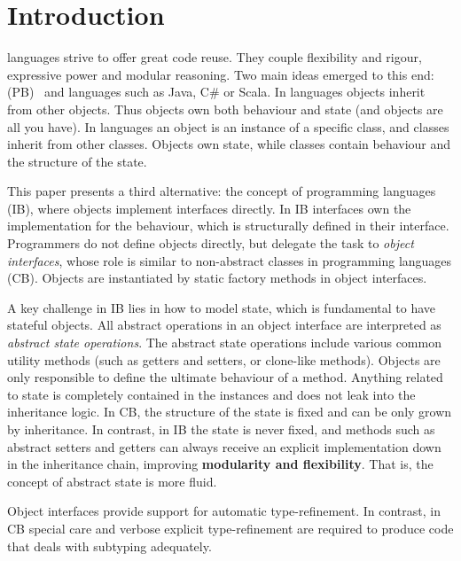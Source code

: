 \section{Introduction}\label{sec:intro}

\Objectoriented languages strive to offer great code reuse.
They couple flexibility and rigour, expressive power and
modular reasoning.  Two main ideas emerged to this end:
\prototypebased (PB)~\cite{Ungar87self} and \classbased languages such as
Java, C\# or Scala.  In \prototypebased
languages objects inherit from other objects. Thus objects own
both behaviour and state (and objects are all you have).
In \classbased languages an object is an instance of a specific class,
and classes inherit from other classes.  Objects own state,
while classes contain behaviour and the structure of the state.

This paper presents a third alternative: the concept of
\emph{\interfacebased} \objectoriented programming languages (IB), where objects
implement interfaces directly. In IB interfaces own the implementation
for the behaviour, which is structurally defined in their
interface. Programmers do not define objects directly, but delegate
the task to \emph{object interfaces}, whose role is similar to non-abstract
classes in \classbased \objectoriented programming languages
(CB). Objects 
are instantiated by static factory methods in object interfaces.

A key challenge in IB lies in how to model state, which is
fundamental to have stateful objects. All abstract operations in an
object interface are interpreted as \emph{abstract state
  operations}. The abstract state operations include various common
utility methods (such as getters and setters, or clone-like
methods). Objects are only responsible to define the ultimate
behaviour of a method. %
Anything related to state is completely contained in the
instances and does not leak into the inheritance logic.  In CB, the structure of the state is fixed and can be only grown
by inheritance.  In contrast, in IB the state is never
fixed, and methods such as abstract setters and getters
can always receive an explicit implementation down in the inheritance
chain, improving \textbf{modularity and flexibility}.  That is, the
concept of abstract state is more fluid.


Object interfaces
provide support for automatic type-refinement.
In contrast, in CB 
special care and verbose explicit type-refinement are required to
produce code that deals with subtyping adequately.

